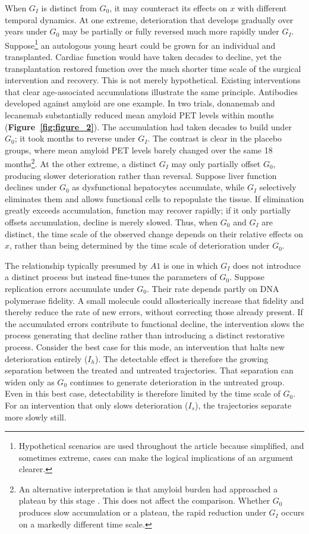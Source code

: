 \documentclass[twocolumn]{article} %
\begin{document}
When $G_I$ is distinct from $G_0$, it may counteract its effects on $x$ with different temporal dynamics.  At one extreme, deterioration that develops gradually over years under $G_0$ may be partially or fully reversed much more rapidly under $G_I$. Suppose\footnote{Hypothetical scenarios are used throughout the article because simplified, and sometimes extreme, cases can make the logical implications of an argument clearer.} an autologous young heart could be grown for an individual and transplanted. Cardiac function would have taken decades to decline, yet the transplantation restored function over the much shorter time scale of the surgical intervention and recovery. This is not merely hypothetical. Existing interventions that clear age-associated accumulations illustrate the same principle. Antibodies developed against amyloid are one example. In two trials, donanemab and lecanemab substantially reduced mean amyloid PET levels within months (\textbf{Figure~\ref{fig:figure_2}}). The accumulation had taken decades to build under $G_0$; it took months to reverse under $G_I$. The contrast is clear in the placebo groups, where mean amyloid PET levels barely changed over the same 18 months\footnote{An alternative interpretation is that amyloid burden had approached a plateau by this stage \cite{jack2013brain}. This does not affect the comparison. Whether $G_0$ produces slow accumulation or a plateau, the rapid reduction under $G_I$ occurs on a markedly different time scale.}. At the other extreme, a distinct $G_I$ may only partially offset $G_0$, producing slower deterioration rather than reversal. Suppose liver function declines under $G_0$ as dysfunctional hepatocytes accumulate, while $G_I$ selectively eliminates them and allows functional cells to repopulate the tissue. If elimination greatly exceeds accumulation, function may recover rapidly; if it only partially offsets accumulation, decline is merely slowed. Thus, when $G_0$ and $G_I$ are distinct, the time scale of the observed change depends on their relative effects on $x$, rather than being determined by the time scale of deterioration under $G_0$.

The relationship typically presumed by $A1$ is one in which $G_I$ does not introduce a distinct process but instead fine-tunes the parameters of $G_0$. Suppose replication errors accumulate under $G_0$. Their rate depends partly on DNA polymerase fidelity. A small molecule could allosterically increase that fidelity and thereby reduce the rate of new errors, without correcting those already present. If the accumulated errors contribute to functional decline, the intervention slows the process generating that decline rather than introducing a distinct restorative process. Consider the best case for this mode, an intervention that halts new deterioration entirely ($I_h$). The detectable effect is therefore the growing separation between the treated and untreated trajectories. That separation can widen only as $G_0$ continues to generate deterioration in the untreated group. Even in this best case, detectability is therefore limited by the time scale of $G_0$. For an intervention that only slows deterioration ($I_s$), the trajectories separate more slowly still.
\end{document}

